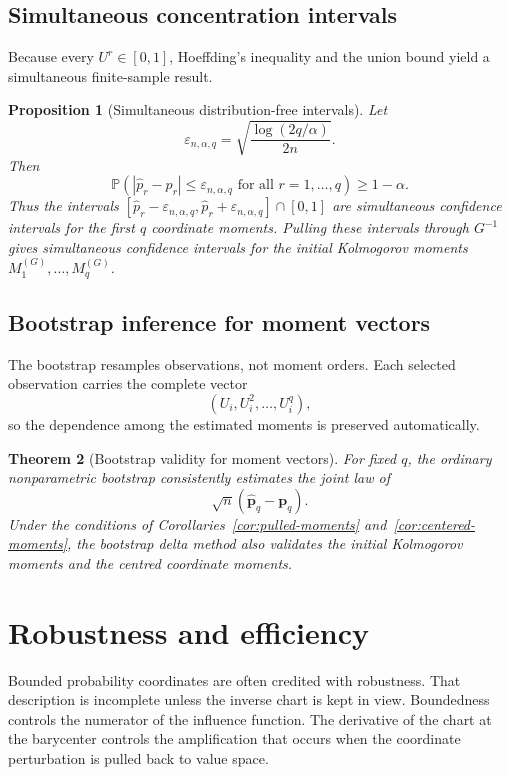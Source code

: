 \documentclass[11pt,a4paper]{article}
\newtheorem{theorem}{Theorem}[section]
\newtheorem{proposition}[theorem]{Proposition}
\theoremstyle{definition}
\newcommand{\Prob}{\mathbb{P}}
\begin{document}
\subsection{Simultaneous concentration intervals}

Because every $U^r\in[0,1]$, Hoeffding's inequality and the union bound yield a simultaneous finite-sample result.

\begin{proposition}[Simultaneous distribution-free intervals]\label{prop:moment-hoeffding}
Let
\[
\varepsilon_{n,\alpha,q}
=
\sqrt{\frac{\log(2q/\alpha)}{2n}}.
\]
Then
\[
\Prob\left(
|\widehat p_r-p_r|\leq\varepsilon_{n,\alpha,q}
\text{ for all }r=1,\ldots,q
\right)
\geq1-\alpha.
\]
Thus the intervals $[\widehat p_r-\varepsilon_{n,\alpha,q},\widehat p_r+\varepsilon_{n,\alpha,q}]\cap[0,1]$ are simultaneous confidence intervals for the first $q$ coordinate moments. Pulling these intervals through $G^{-1}$ gives simultaneous confidence intervals for the initial Kolmogorov moments $M_1^{(G)},\ldots,M_q^{(G)}$.
\end{proposition}

\subsection{Bootstrap inference for moment vectors}

The bootstrap resamples observations, not moment orders. Each selected observation carries the complete vector
\[
(U_i,U_i^2,\ldots,U_i^q),
\]
so the dependence among the estimated moments is preserved automatically.

\begin{theorem}[Bootstrap validity for moment vectors]\label{thm:moment-bootstrap}
For fixed $q$, the ordinary nonparametric bootstrap consistently estimates the joint law of
\[
\sqrt n(\widehat{\mathbf p}_q-\mathbf p_q).
\]
Under the conditions of Corollaries~\ref{cor:pulled-moments} and~\ref{cor:centered-moments}, the bootstrap delta method also validates the initial Kolmogorov moments and the centred coordinate moments.
\end{theorem}

\section{Robustness and efficiency}\label{sec:robustness}

Bounded probability coordinates are often credited with robustness. That description is incomplete unless the inverse chart is kept in view. Boundedness controls the numerator of the influence function. The derivative of the chart at the barycenter controls the amplification that occurs when the coordinate perturbation is pulled back to value space.
\end{document}
